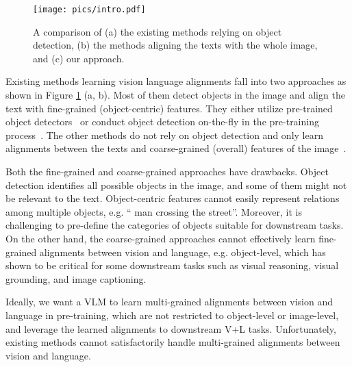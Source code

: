 \documentclass[nohyperref]{article}
\theoremstyle{plain}
\theoremstyle{definition}
\theoremstyle{remark}
\begin{document}
\begin{figure}[ht]
\begin{center}
\centerline{\texttt{[image: pics/intro.pdf]}}
\caption{
A comparison of (a) the existing methods relying on object detection, (b) the methods aligning the texts with the whole image, and (c) our approach. 
}
\label{Fig:intro}
\end{center}
\end{figure}




Existing methods learning vision language alignments fall into two approaches as shown in Figure \ref{Fig:intro} (a, b). Most of them detect objects in the image and align the text with fine-grained (object-centric) features. They either utilize pre-trained object detectors~\cite{tan2019lxmert, lu2019vilbert, li2019visualbert, li2020unicoder, chen2020uniter, li2020oscar, gan2020large} or conduct object detection on-the-fly in the pre-training process~\cite{su2019vl, xu2021e2e}. The other methods do not rely on object detection and only learn alignments between the texts and coarse-grained (overall) features of the image~\cite{huang2020pixel, huang2021seeing, kim2021vilt, li2021align}. 


Both the fine-grained and coarse-grained approaches have drawbacks. Object detection identifies all possible objects in the image, and some of them might not be relevant to the text. Object-centric features cannot easily represent relations among multiple objects, e.g. `` man crossing the street''. Moreover, it is challenging to pre-define the categories of objects suitable for downstream tasks. On the other hand, the coarse-grained approaches cannot effectively learn fine-grained alignments between vision and language, e.g. object-level, which has shown to be critical for some downstream tasks such as visual reasoning, visual grounding, and image captioning. 


Ideally, we want a VLM to learn multi-grained alignments between vision and language in pre-training, which are not restricted to object-level or image-level, and leverage the learned alignments to downstream V+L tasks. Unfortunately, existing methods cannot satisfactorily handle multi-grained alignments between vision and language. 
\end{document}

